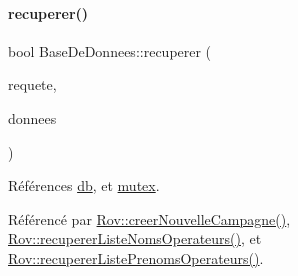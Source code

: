 \paragraph{\texorpdfstring{recuperer()}{recuperer()}\hspace{0.1cm}{\footnotesize\ttfamily [1/4]}}
{\footnotesize\ttfamily bool Base\+De\+Donnees\+::recuperer (\begin{DoxyParamCaption}\item[{Q\+String}]{requete,  }\item[{Q\+String \&}]{donnees }\end{DoxyParamCaption})}



Références \hyperlink{class_base_de_donnees_a3e738dcf443370c46a541677ab619f06}{db}, et \hyperlink{class_base_de_donnees_aa1b4696fac87a740f914aa73739086f2}{mutex}.



Référencé par \hyperlink{class_rov_ae1306036b067e9ad50a09f9dd607a092}{Rov\+::creer\+Nouvelle\+Campagne()}, \hyperlink{class_rov_a490eefb90bf28e83f181d770f0f52446}{Rov\+::recuperer\+Liste\+Noms\+Operateurs()}, et \hyperlink{class_rov_a84dece742f5c4c903ada4f25c869597f}{Rov\+::recuperer\+Liste\+Prenoms\+Operateurs()}.



